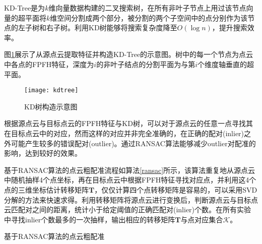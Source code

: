 KD-Tree是为$k$维向量数据构建的二叉搜索树，在所有非叶子节点上用过该节点向量的超平面将$k$维空间分割成两个部分，被分割的两个子空间中的点分别作为该节点的左子树和右子树。利用KD树能够将搜索复杂度降至$O(\log n)$，提升搜索效率。

图\ref{kdtree}展示了从源点云提取特征并构造KD-Tree的示意图。树中的每一个节点为点云中各点的FPFH特征，深度为$i$的非叶子结点的分割平面为与第$i$个维度轴垂直的超平面。
\begin{figure}
	\centering
	\texttt{[image: kdtree]}
	\caption{KD树构造示意图}
	\label{kdtree}
\end{figure}

根据源点云与目标点云的FPFH特征与KD树，可以对于源点云的任意一点寻找其在目标点云中的对应，然而这样的对应并非完全准确的，在正确的配对(inlier)之外可能产生较多的错误配对(outlier)。通过RANSAC算法能够减少outlier对配准的影响，达到较好的效果。

基于RANSAC算法的点云粗配准流程如算法\ref{ransac}所示，该算法重复地从源点云中随机抽样4个点坐标，再在目标点云中根据FPFH特征寻找对应点，并利用这4个点的三维坐标估计转移矩阵$\boldsymbol{T}$，仅仅计算四个点转移矩阵是容易的，可以采用SVD分解\cite{golub1971singular}的方法来快速求得。利用转移矩阵将源点云进行变换后，判断源点云与目标点云匹配对之间的距离，统计小于给定阈值的正确匹配对(inlier)个数。在所有实验中寻找inlier个数最多的一次抽样，输出相应的转移矩阵$\boldsymbol{T}$与点对应集合$\mathcal{K}$。

\renewcommand{\algorithmicrequire}{\textbf{输入：}\unskip}
\renewcommand{\algorithmicensure}{\textbf{输出：}\unskip}
\begin{algorithm}
	\caption{基于RANSAC算法的点云粗配准}
	\label{ransac}
	\small
	\begin{algorithmic}
		
		
				\ENDIF
				\ENDIF
			\ENDFOR
		\ENDFOR
	\end{algorithmic}
\end{algorithm}

